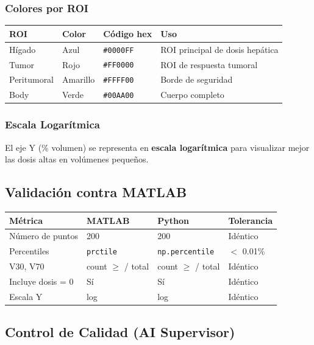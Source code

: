 \documentclass[12pt,a4paper]{article}
\begin{document}
\subsubsection{Colores por ROI}

\begin{tabular}{p{3cm} p{3cm} p{3cm} p{5cm}}
\toprule
\textbf{ROI} & \textbf{Color} & \textbf{Código hex} & \textbf{Uso} \\
\midrule
Hígado & Azul & \texttt{\#0000FF} & ROI principal de dosis hepática \\
Tumor & Rojo & \texttt{\#FF0000} & ROI de respuesta tumoral \\
Peritumoral & Amarillo & \texttt{\#FFFF00} & Borde de seguridad \\
Body & Verde & \texttt{\#00AA00} & Cuerpo completo \\
\bottomrule
\end{tabular}

\subsubsection{Escala Logarítmica}

El eje Y (\% volumen) se representa en \textbf{escala logarítmica} para visualizar mejor las dosis altas en volúmenes pequeños.

\subsection{Validación contra MATLAB}

\begin{tabular}{p{4cm} p{2.5cm} p{2.5cm} p{2.5cm}}
\toprule
\textbf{Métrica} & \textbf{MATLAB} & \textbf{Python} & \textbf{Tolerancia} \\
\midrule
Número de puntos & 200 & 200 & Idéntico \\
Percentiles & \texttt{prctile} & \texttt{np.percentile} & $<$ 0.01\% \\
V30, V70 & count $\geq$ / total & count $\geq$ / total & Idéntico \\
Incluye dosis = 0 & Sí & Sí & Idéntico \\
Escala Y & log & log & Idéntico \\
\bottomrule
\end{tabular}

\subsection*{Control de Calidad (AI Supervisor)}
\end{document}
